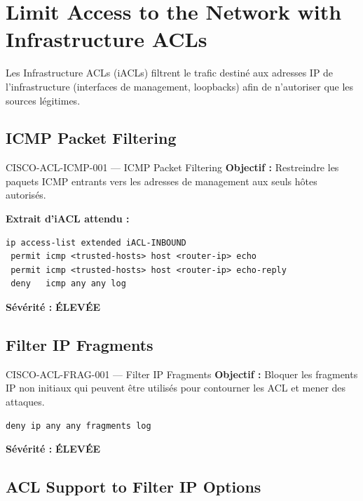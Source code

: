 \documentclass[12pt, a4paper]{report}
\begin{document}
\section{Limit Access to the Network with Infrastructure ACLs}

Les Infrastructure ACLs (iACLs) filtrent le trafic destiné aux adresses IP de l'infrastructure (interfaces de management, loopbacks) afin de n'autoriser que les sources légitimes.

\subsection{ICMP Packet Filtering}

\begin{rulebox}{CISCO-ACL-ICMP-001 — ICMP Packet Filtering}
  \textbf{Objectif :} Restreindre les paquets ICMP entrants vers les adresses de management aux seuls hôtes autorisés.

  \textbf{Extrait d'iACL attendu :}
  \begin{lstlisting}
ip access-list extended iACL-INBOUND
 permit icmp <trusted-hosts> host <router-ip> echo
 permit icmp <trusted-hosts> host <router-ip> echo-reply
 deny   icmp any any log
  \end{lstlisting}

  \textbf{Sévérité :} \textcolor{accentOrange}{\textbf{ÉLEVÉE}}
\end{rulebox}

\subsection{Filter IP Fragments}

\begin{rulebox}{CISCO-ACL-FRAG-001 — Filter IP Fragments}
  \textbf{Objectif :} Bloquer les fragments IP non initiaux qui peuvent être utilisés pour contourner les ACL et mener des attaques.

  \begin{lstlisting}
deny ip any any fragments log
  \end{lstlisting}

  \textbf{Sévérité :} \textcolor{accentOrange}{\textbf{ÉLEVÉE}}
\end{rulebox}

\subsection{ACL Support to Filter IP Options}
\end{document}
